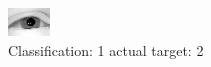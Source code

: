 \begin{figure}[h!]
\begin{center}
\includegraphics[width=0.60\columnwidth]{figures/ID2233_class_1_target_2.png}
\end{center}
\caption{ Classification: 1 actual target: 2}
\label{fig:ID2233_class_1_target_2}
\end{figure}
